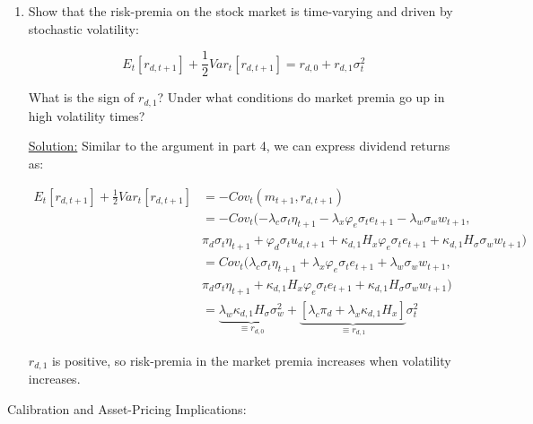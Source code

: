 \documentclass{article}
\begin{document}
\begin{enumerate}
\item Show that the risk-premia on the stock market is time-varying and driven by stochastic volatility:

$$
E_t [r_{d,t+1}] + \frac{1}{2} Var_t [r_{d,t+1}] = r_{d,0} + r_{d,1} \sigma_t^2
$$

What is the sign of $r_{d,1}$? Under what conditions do market premia go up in high volatility times?

\bigskip

\underline{Solution:}  Similar to the argument in part 4, we can express dividend returns as:

\begin{align*}
E_t [r_{d,t+1}] + \frac{1}{2} Var_t [r_{d,t+1}] 
&= - Cov_t(m_{t+1}, r_{d,t+1})\\
&= - Cov_t(- \lambda_c \sigma_t \eta_{t+1} - \lambda_x \varphi_e \sigma_t e_{t+1} - \lambda_w \sigma_w w_{t+1}, \\& \pi_d \sigma_t \eta_{t+1} + \varphi_d  \sigma_t u_{d,t+1} + \kappa_{d,1} H_x \varphi_e \sigma_t e_{t+1} + \kappa_{d,1} H_\sigma \sigma_w w_{t+1})\\
&= Cov_t(\lambda_c \sigma_t \eta_{t+1} + \lambda_x \varphi_e \sigma_t e_{t+1} + \lambda_w \sigma_w w_{t+1}, \\& \pi_d \sigma_t \eta_{t+1} + \kappa_{d,1} H_x \varphi_e \sigma_t e_{t+1} + \kappa_{d,1} H_\sigma \sigma_w w_{t+1})\\
&= \underbrace{\lambda_w \kappa_{d,1}H_{\sigma} \sigma_w^2}_{\equiv r_{d,0}} + \underbrace{[\lambda_c \pi_d + \lambda_x \kappa_{d,1} H_x]}_{\equiv r_{d,1}} \sigma_t^2 
\end{align*}

$r_{d,1}$ is positive, so risk-premia in the market premia increases when volatility increases.

\bigskip

\end{enumerate}

\pagebreak

Calibration and Asset-Pricing Implications:
\end{document}
